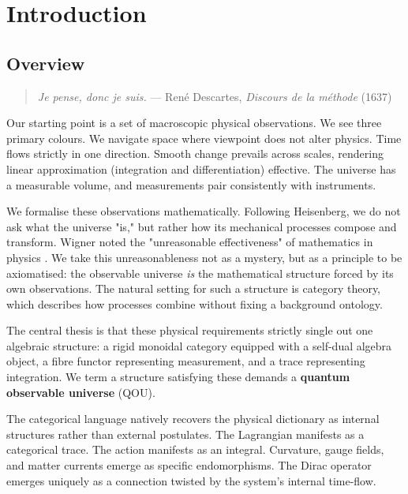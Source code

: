 \clearpage
\chapter*{Introduction}
\label{chap:introduction}

\section{Overview}
\label{sec:introduction-overview}
\begin{quote}
\emph{Je pense, donc je suis.}
— René Descartes, \emph{Discours de la méthode} (1637)
\end{quote}

Our starting point is a set of macroscopic physical observations. We see three primary colours. We navigate space where viewpoint does not alter physics. Time flows strictly in one direction. Smooth change prevails across scales, rendering linear approximation (integration and differentiation) effective. The universe has a measurable volume, and measurements pair consistently with instruments.

We formalise these observations mathematically. Following Heisenberg, we do not ask what the universe "is," but rather how its mechanical processes compose and transform. Wigner noted the "unreasonable effectiveness" of mathematics in physics \cite{wigner1960}. We take this unreasonableness not as a mystery, but as a principle to be axiomatised: the observable universe \emph{is} the mathematical structure forced by its own observations. The natural setting for such a structure is category theory, which describes how processes combine without fixing a background ontology.

The central thesis is that these physical requirements strictly single out one algebraic structure: a rigid monoidal category equipped with a self-dual algebra object, a fibre functor representing measurement, and a trace representing integration. We term a structure satisfying these demands a \textbf{quantum observable universe} (QOU).

The categorical language natively recovers the physical dictionary as internal structures rather than external postulates. The Lagrangian manifests as a categorical trace. The action manifests as an integral. Curvature, gauge fields, and matter currents emerge as specific endomorphisms. The Dirac operator emerges uniquely as a connection twisted by the system's internal time-flow.

